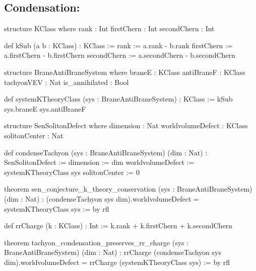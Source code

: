 \subsection{Condensation: }

\begin{leancode}
structure KClass where
  rank : Int
  firstChern : Int
  secondChern : Int

def kSub (a b : KClass) : KClass := {
  rank := a.rank - b.rank
  firstChern := a.firstChern - b.firstChern
  secondChern := a.secondChern - b.secondChern
}

structure BraneAntiBraneSystem where
  braneE : KClass
  antiBraneF : KClass
  tachyonVEV : Nat
  is_annihilated : Bool

def systemKTheoryClass (sys : BraneAntiBraneSystem) : KClass :=
  kSub sys.braneE sys.antiBraneF

structure SenSolitonDefect where
  dimension : Nat
  worldvolumeDefect : KClass
  solitonCenter : Nat

def condenseTachyon (sys : BraneAntiBraneSystem) (dim : Nat) :
    SenSolitonDefect := {
  dimension := dim
  worldvolumeDefect := systemKTheoryClass sys
  solitonCenter := 0
}

theorem sen_conjecture_k_theory_conservation
    (sys : BraneAntiBraneSystem) (dim : Nat) :
    (condenseTachyon sys dim).worldvolumeDefect
      = systemKTheoryClass sys := by rfl

def rrCharge (k : KClass) : Int :=
  k.rank + k.firstChern + k.secondChern

theorem tachyon_condensation_preserves_rr_charge
    (sys : BraneAntiBraneSystem) (dim : Nat) :
    rrCharge (condenseTachyon sys dim).worldvolumeDefect
      = rrCharge (systemKTheoryClass sys) := by rfl
\end{leancode}
